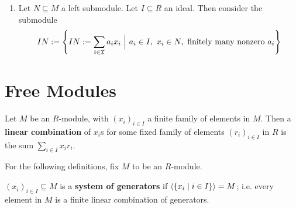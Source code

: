 \begin{enumerate}
\begin{proof}
            \begin{minipage}{\linewidth}
                \centering
            \end{minipage}

            In order to apply the first isomorphism theorem, it suffices to show that $M_1 \cap M_2 = \ker f$: as then the universal property grants the existence of such $h$, which allows the application of the First Isomorphism Theorem. This is indeed the case, as
            \begin{itemize}
                \item $M_1 \cap M_2 \subseteq \ker f$, as $M_1 \cap M_2 \subseteq M_2$ which is mapped to 0 by $f$.
                \item $M_1 \cap M_2 \supseteq \ker f$. For all $x\in \ker f$, by hypothesis $x\in M_1$; and the only elements that are annihilated by the quotient are those in $M_2$.
            \end{itemize}
        \end{proof}
    \item Let $N\subseteq M$ a left submodule. Let $I\subseteq R$ an ideal. Then consider the submodule
         \[
             IN := \left\{ IN := \sum\limits_{i\in\mathcal{I}} a_i x_i \bigmid a_i \in I,\ x_i\in N,\ \text{finitely many nonzero } a_i \right\}
         \]
\end{enumerate}

\section{Free Modules}

\begin{definition}
    Let $M$ be an $R$-module, with $(x_i)_{i\in I}$ a finite family of elements in $M$. Then a \textbf{linear combination} of $x_i$s for some fixed family of elements $(r_i)_{i\in I}$ in $R$ is the sum $\sum\limits_{i\in I} x_i r_i$.
\end{definition}

For the following definitions, fix $M$ to be an $R$-module.
\begin{definition}
    $(x_i)_{i\in I} \subseteq M$ is a \textbf{system of generators} if $\left\langle \{x_i \mid i\in I \} \right\rangle = M$; i.e. every element in $M$ is a finite linear combination of generators.
\end{definition}

